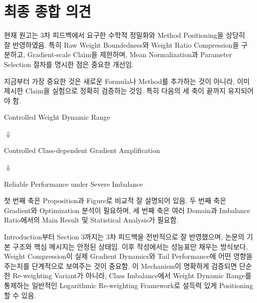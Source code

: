 \documentclass[11pt,a4paper]{article}
\begin{document}
\section{최종 종합 의견}

현재 원고는 3차 피드백에서 요구한 수학적 정밀화와 Method Positioning을 상당히 잘 반영하였음. 특히 Raw Weight Boundedness와 Weight Ratio Compression을 구분하고, Gradient-scale Claim을 제한하며, Mean Normalization과 Parameter Selection 절차를 명시한 점은 중요한 개선임.

지금부터 가장 중요한 것은 새로운 Formula나 Method를 추가하는 것이 아니라, 이미 제시한 Claim을 실험으로 정확히 검증하는 것임. 특히 다음의 세 축이 끝까지 유지되어야 함.

\begin{center}
Controlled Weight Dynamic Range

$\Downarrow$

Controlled Class-dependent Gradient Amplification

$\Downarrow$

Reliable Performance under Severe Imbalance
\end{center}

첫 번째 축은 Proposition과 Figure로 비교적 잘 설명되어 있음. 두 번째 축은 Gradient와 Optimization 분석이 필요하며, 세 번째 축은 여러 Domain과 Imbalance Ratio에서의 Main Result 및 Statistical Analysis가 필요함.

\begin{tcolorbox}[title=최종 판단]
Introduction부터 Section 3까지는 3차 피드백을 전반적으로 잘 반영했으며, 논문의 기본 구조와 핵심 메시지는 안정된 상태임. 이후 작성에서는 성능표만 채우는 방식보다, Weight Compression이 실제 Gradient Dynamics와 Tail Performance에 어떤 영향을 주는지를 단계적으로 보여주는 것이 중요함. 이 Mechanism이 명확하게 검증되면 단순한 Re-weighting Variant가 아니라, Class Imbalance에서 Weight Dynamic Range를 통제하는 일반적인 Logarithmic Re-weighting Framework로 설득력 있게 Positioning할 수 있음.
\end{tcolorbox}
\end{document}
